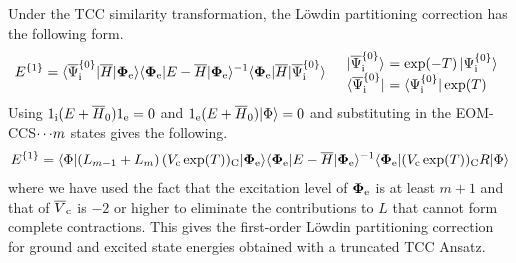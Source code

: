 \documentclass[11pt]{article}
\numberwithin{equation}{section}
\begin{document}
\begin{rmk}
Under the TCC similarity transformation, the L\"owdin partitioning correction has the following form.
\begin{align}
  E^{\{1\}}
=
  \ip{\ol{\Y}_\mr{i}^{\{0\}}|\ol{H}|\bo{\F}_\mr{e}}
  \ip{\bo{\F}_\mr{e}|E - \ol{H}|\bo{\F}_\mr{e}}^{-1}
  \ip{\bo{\F}_\mr{e}|\ol{H}|\ol{\Y}_\mr{i}^{\{0\}}}
&&
\begin{array}{r@{\ }l}
  \kt{\ol{\Y}_\mr{i}^{\{0\}}}
&=
  \mr{exp}(-T)\,\kt{\Y_\mr{i}^{\{0\}}}
\\
  \br{\ol{\Y}_\mr{i}^{\{0\}}}
&=
  \br{\Y_\mr{i}^{\{0\}}}\,
  \mr{exp}(T)
\end{array}
\end{align}
Using
$
  1_{\mathrm{i}}(E + \overline{H}_0) 1_{\mathrm{e}}
=
  0
$
and
$
  1_{\mathrm{e}}(E + \overline{H}_0)|\Phi \rangle
=
  0
$
and substituting in the EOM-CCS${\cdots}m$ states gives the following.
\begin{align}
  E^{\{1\}}
=
  \langle\Phi |(L_{m-1} + L_m)\,(V_{\mathrm{c}}\,\mathrm{exp}(T))_{\mathrm{C}}|\mathbf{\Phi }_{\mathrm{e}}\rangle
  \langle\mathbf{\Phi }_{\mathrm{e}}|E - \overline{H}|\mathbf{\Phi }_{\mathrm{e}}\rangle^{-1}
  \langle\mathbf{\Phi }_{\mathrm{e}}|(V_{\mathrm{c}}\,\mathrm{exp}(T))_{\mathrm{C}} R|\Phi \rangle
\end{align}
where we have used the fact that the excitation level of $\bm{\F}_\mr{e}$ is at least $m+1$ and that of $\overline{V}_{\mathrm{c}}$ is $-2$ or higher to eliminate the contributions to $L$ that cannot form complete contractions.
This gives the first-order L\"owdin partitioning correction for ground and excited state energies obtained with a truncated TCC Ansatz.
\end{rmk}
\end{document}
